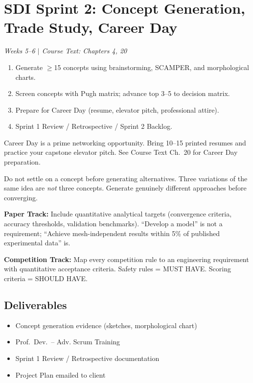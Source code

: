 \section{SDI Sprint 2: Concept Generation, Trade Study, Career Day}
\textit{Weeks 5--6 $|$ Course Text: Chapters 4, 20}

\begin{priorities}
\begin{enumerate}[nosep]
\item Generate $\geq$15 concepts using brainstorming, SCAMPER, and morphological charts.
\item Screen concepts with Pugh matrix; advance top 3--5 to decision matrix.
\item Prepare for Career Day (resume, elevator pitch, professional attire).
\item Sprint 1 Review / Retrospective / Sprint 2 Backlog.
\end{enumerate}
\end{priorities}

\begin{protip}
Career Day is a prime networking opportunity. Bring 10--15 printed resumes and practice your capstone elevator pitch. See Course Text Ch.~20 for Career Day preparation.
\end{protip}

\begin{warnbox}
Do not settle on a concept before generating alternatives. Three variations of the same idea are \emph{not} three concepts. Generate genuinely different approaches before converging.
\end{warnbox}

\begin{faqbox}
\textbf{Paper Track:} Include quantitative analytical targets (convergence criteria, accuracy thresholds, validation benchmarks). ``Develop a model'' is not a requirement; ``Achieve mesh-independent results within 5\% of published experimental data'' is.

\textbf{Competition Track:} Map every competition rule to an engineering requirement with quantitative acceptance criteria. Safety rules = MUST HAVE. Scoring criteria = SHOULD HAVE.
\end{faqbox}

\subsection{Deliverables}
\begin{itemize}[nosep,leftmargin=1.5em]
\item Concept generation evidence (sketches, morphological chart)
\item Prof.~Dev.~-- Adv. Scrum Training
\item Sprint 1 Review / Retrospective documentation
\item Project Plan emailed to client
\end{itemize}


